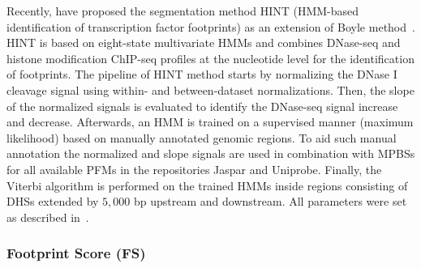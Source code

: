\documentclass[11pt]{article}
\begin{document}
Recently, \cite{gusmao2014} have proposed the segmentation method HINT (HMM-based identification of transcription factor footprints) as an extension of Boyle method~\citep{boyle2011}. HINT is based on eight-state multivariate HMMs and combines DNase-seq and histone modification ChIP-seq profiles at the nucleotide level for the identification of footprints. The pipeline of HINT method starts by normalizing the DNase I cleavage signal using within- and between-dataset normalizations. Then, the slope of the normalized signals is evaluated to identify the DNase-seq signal increase and decrease. Afterwards, an HMM is trained on a supervised manner (maximum likelihood) based on manually annotated genomic regions. To aid such manual annotation the normalized and slope signals are used in combination with MPBSs for all available PFMs in the repositories Jaspar and Uniprobe. Finally, the Viterbi algorithm is performed on the trained HMMs inside regions consisting of DHSs extended by $5,000$ bp upstream and downstream. All parameters were set as described in~\cite{gusmao2014}.

{}

\subsubsection{Footprint Score (FS)}
\label{sec:fs}
\end{document}
